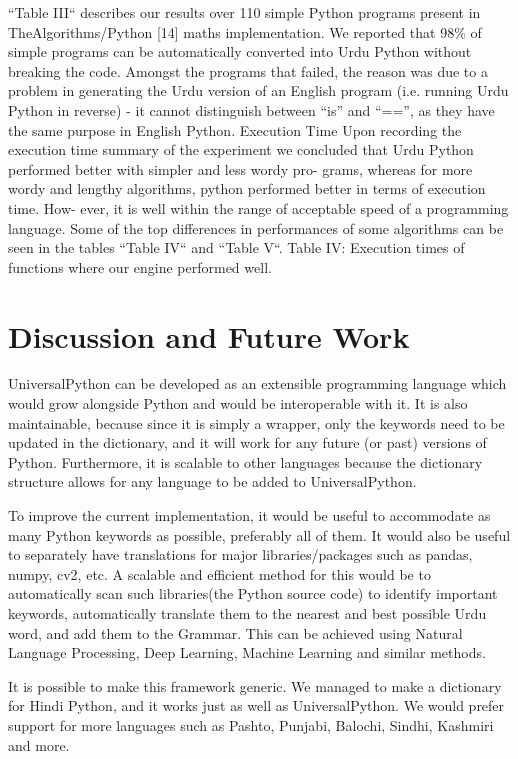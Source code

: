 \documentclass[conference]{IEEEtran}
\begin{document}
“Table III“ describes our results over 110 simple Python programs present in TheAlgorithms/Python [14] maths implementation.
We reported that 98\% of simple programs can be automatically converted into Urdu Python without breaking the code. Amongst the programs that failed, the reason was due to a problem in generating the Urdu version of an English program (i.e. running Urdu Python in reverse) - it cannot distinguish between “is” and “==”, as they have the same purpose in English Python.
Execution Time Upon recording the execution time summary of the experiment we concluded that Urdu Python performed better with simpler and less wordy pro- grams, whereas for more wordy and lengthy algorithms, python performed better in terms of execution time. How- ever, it is well within the range of acceptable speed of a programming language. Some of the top differences in performances of some algorithms can be seen in the tables “Table IV“ and “Table V“.
Table IV: Execution times of functions where our engine performed well.

\section{Discussion and Future Work}

UniversalPython can be developed as an extensible programming language which would grow alongside Python and would be interoperable with it. It is also maintainable, because since it is simply a wrapper, only the keywords need to be updated in the dictionary, and it will work for any future (or past) versions of Python. Furthermore, it is scalable to other languages because the dictionary structure allows for any language to be added to UniversalPython.

To improve the current implementation, it would be useful to accommodate as many Python keywords as possible, preferably all of them. It would also be useful to separately have translations for major libraries/packages such as pandas, numpy, cv2, etc. A scalable and eﬀicient method for this would be to automatically scan such libraries(the Python source code) to identify important keywords, automatically translate them to the nearest and best possible Urdu word, and add them to the Grammar. This can be achieved using Natural Language Processing, Deep Learning, Machine Learning and similar methods.

It is possible to make this framework generic. We managed to make a dictionary for Hindi Python, and it works just as well as UniversalPython. We would prefer support for more languages such as Pashto, Punjabi, Balochi, Sindhi, Kashmiri and more.
\end{document}
